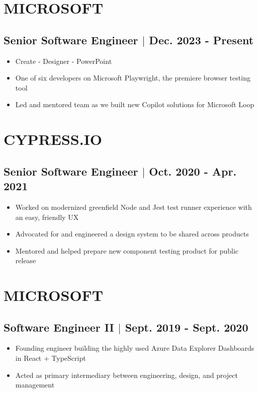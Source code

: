 \documentclass[10pt]{article}
\begin{document}
\section{MICROSOFT}
\subsection{Senior Software Engineer $\vert$ Dec. 2023 - Present}
\begin{itemize}
    \item Create - Designer - PowerPoint
    \item One of six developers on Microsoft Playwright, the premiere browser testing tool
    \item Led and mentored team as we built new Copilot solutions for Microsoft Loop
\end{itemize}

\section{CYPRESS.IO}
\subsection{Senior Software Engineer $\vert$ Oct. 2020 - Apr. 2021}
\begin{itemize}
    \item Worked on modernized greenfield Node and Jest test runner experience with an easy, friendly UX
    \item Advocated for and engineered a design system to be shared across products
    \item Mentored and helped prepare new component testing product for public release
\end{itemize}
 
\section{MICROSOFT}
\subsection{Software Engineer II $\vert$ Sept. 2019 - Sept. 2020}
\begin{itemize}
    \item Founding engineer building the highly used Azure Data Explorer Dashboards in React + TypeScript
    \item Acted as primary intermediary between engineering, design, and project management
\end{itemize}
\end{document}
